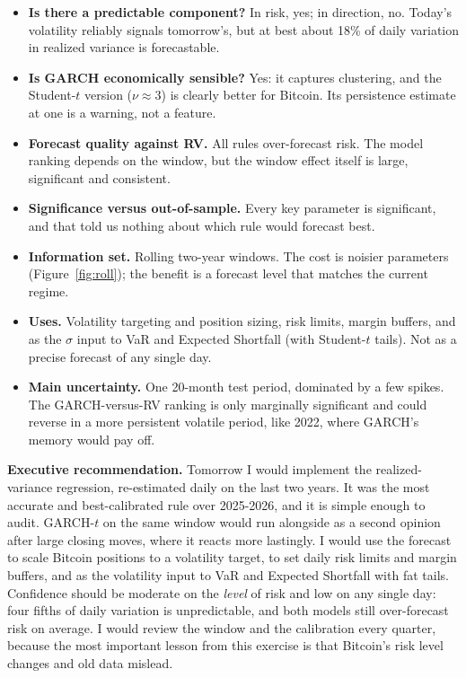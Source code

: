 \documentclass[10pt,a4paper]{article}
\begin{document}
\begin{itemize}
\item \textbf{Is there a predictable component?} In risk, yes; in direction, no. Today's volatility reliably signals
tomorrow's, but at best about 18\% of daily variation in realized variance is forecastable.
\item \textbf{Is GARCH economically sensible?} Yes: it captures clustering, and the Student-$t$ version
($\nu\approx3$) is clearly better for Bitcoin. Its persistence estimate at one is a warning, not a feature.
\item \textbf{Forecast quality against RV.} All rules over-forecast risk. The model ranking depends on the window, but
the window effect itself is large, significant and consistent.
\item \textbf{Significance versus out-of-sample.} Every key parameter is significant, and that told us nothing about
which rule would forecast best.
\item \textbf{Information set.} Rolling two-year windows. The cost is noisier parameters (Figure~\ref{fig:roll}); the
benefit is a forecast level that matches the current regime.
\item \textbf{Uses.} Volatility targeting and position sizing, risk limits, margin buffers, and as the $\sigma$ input
to VaR and Expected Shortfall (with Student-$t$ tails). Not as a precise forecast of any single day.
\item \textbf{Main uncertainty.} One 20-month test period, dominated by a few spikes. The GARCH-versus-RV ranking is
only marginally significant and could reverse in a more persistent volatile period, like 2022, where GARCH's
memory would pay off.
\end{itemize}

\begin{tcolorbox}[colback=white,colframe=black,boxrule=0.4pt,sharp corners,left=6pt,right=6pt,top=4pt,bottom=4pt]
\textbf{Executive recommendation.} Tomorrow I would implement the realized-variance regression, re-estimated daily on
the last two years. It was the most accurate and best-calibrated rule over 2025-2026, and it is simple enough to audit.
GARCH-$t$ on the same window would run alongside as a second opinion after large closing moves, where it reacts more
lastingly. I would use the forecast to scale Bitcoin positions to a volatility target, to set daily risk limits and margin
buffers, and as the volatility input to VaR and Expected Shortfall with fat tails. Confidence should be moderate on the
\emph{level} of risk and low on any single day: four fifths of daily variation is unpredictable, and both models still
over-forecast risk on average. I would review the window and the calibration every quarter, because the most important lesson
from this exercise is that Bitcoin's risk level changes and old data mislead.
\end{tcolorbox}
\end{document}
